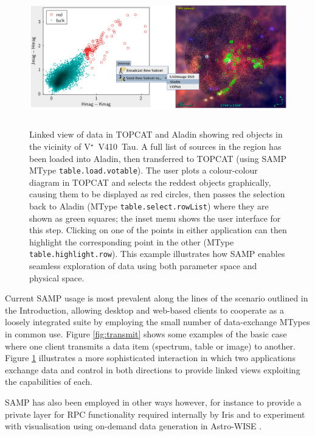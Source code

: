 \documentclass[5p]{elsarticle}
\begin{document}
\begin{figure}
\begin{center}
\includegraphics[height=6cm]{linked-ir.png}
\end{center}
\caption{\label{fig:linked}
Linked view of data in TOPCAT and Aladin showing
red objects in the vicinity of V$^{\star}$~V410~Tau.
A full list of sources in the region has been loaded
into Aladin, then transferred to TOPCAT
(using SAMP MType {\tt table.load.votable}).
The user plots a colour-colour diagram in TOPCAT
and selects the reddest objects graphically,
causing them to be displayed as red circles,
then passes the selection back to Aladin
(MType {\tt table.select.rowList}) where
they are shown as green squares;
the inset menu shows the user interface for this step.
Clicking on one of the points in either application can
then highlight the corresponding point in the other
(MType {\tt table.highlight.row}).
This example illustrates how SAMP enables seamless exploration of
data using both parameter space and physical space.
}
\end{figure}

Current SAMP usage is most prevalent along the lines of the scenario
outlined in the Introduction, allowing desktop and web-based clients to
cooperate as a loosely integrated suite
by employing the small number of data-exchange MTypes in common use.
Figure \ref{fig:transmit} shows some examples of
the basic case where one client transmits a data item
(spectrum, table or image) to another.
Figure \ref{fig:linked} illustrates a more sophisticated
interaction in which two applications exchange data and control
in both directions to provide linked views exploiting the
capabilities of each.

SAMP has also been employed in other ways however,
for instance to provide a private layer for RPC functionality
required internally by Iris \citep{ACVOiris}
and to experiment with visualisation using on-demand
data generation in Astro-WISE \citep{2013ExA....35..283B}.
\end{document}
